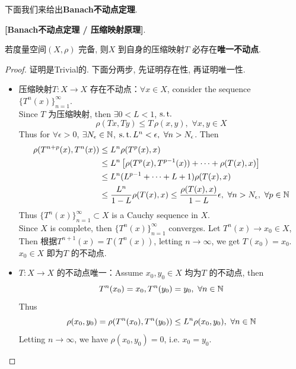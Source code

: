 	下面我们来给出\textbf{Banach不动点定理}.
	\begin{thm}\label{thm 1.9.1}
		\textbf{[Banach不动点定理 / 压缩映射原理]}. 
		\begin{center}
			若度量空间$(X , \rho)$ 完备, 则$X$ 到自身的压缩映射$T$ 必存在\textbf{唯一不动点}.
		\end{center}
		
		\vspace{4em}
		
		\begin{proof}
			证明是Trivial的. 下面分两步, 先证明存在性, 再证明唯一性.
			\begin{itemize}
				\item 压缩映射$T : X \longrightarrow X$ 存在不动点：$\forall x \in X$, consider the sequence $\{ T^{n}(x) \}_{n = 1}^{\infty}$. \\
				Since $T$ 为压缩映射, then $\exists 0 < L < 1$, $\operatorname{s.t.}$
				\[ \rho(Tx , Ty) \leq T \, \rho(x , y) , \,\, \forall x , y \in X \]
				Thus for $\forall \epsilon > 0$, $\exists N_\epsilon \in \mathbb{N}$, $\operatorname{s.t.} L^n < \epsilon , \,\, \forall n > N_\epsilon$. Then
				\begin{align}
					\rho(T^{n + p}(x) , T^{n}(x)) 
					&\leq L^n \rho(T^{p}(x) , x) \\
					&\leq L^n \left[ \rho(T^{p}(x) , T^{p - 1}(x)) + \cdots + \rho(T(x) , x) \right] \\
					&\leq L^n (L^{p - 1} + \cdots + L + 1) \rho(T(x) , x) \\
					&\leq \frac{L^n}{1 - L} \rho(T(x) , x) \leq \frac{\rho(T(x) , x)}{1 - L} \epsilon , \,\, \forall n > N_\epsilon , \,\, \forall p \in \mathbb{N}
				\end{align}
				Thus $\{ T^{n}(x) \}_{n = 1}^{\infty} \subset X$ is a Cauchy sequence in $X$. \\
				Since $X$ is complete, then $\{ T^{n}(x) \}_{n = 1}^{\infty}$ converges. Let $T^n(x) \to x_0 \in X$, \\
				Then 根据$T^{n + 1}(x) = T(T^{n}(x))$, letting $n \to \infty$, we get $T(x_0) = x_0$. $x_0 \in X$ 即为$T$ 的不动点.
				
				\newpage
				
				\item $T : X \longrightarrow X$ 的不动点唯一：Assume $x_0 , y_0 \in X$ 均为$T$ 的不动点, then 
				\[ T^{n}(x_0) = x_0 , T^{n}(y_0) = y_0 , \,\, \forall n \in \mathbb{N} \]
				Thus
				\[ \rho(x_0 , y_0) = \rho(T^{n}(x_0) , T^{n}(y_0)) \leq L^n \rho(x_0 , y_0) , \,\, \forall n \in \mathbb{N} \]
				Letting $n \to \infty$, we have $\rho(x_0 , y_0) = 0$, i.e. $x_0 = y_0$.
			\end{itemize}
		\end{proof}
	\end{thm}
	
